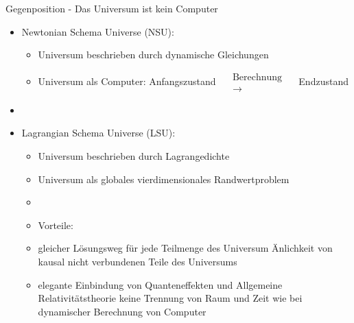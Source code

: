 \documentclass[aspectratio=1610, 9pt]{beamer}
\begin{document}
\begin{frame}{Gegenposition - Das Universum ist kein Computer}
  \begin{itemize}
    \item Newtonian Schema Universe (NSU):
    \begin{itemize}
      \item Universum beschrieben durch dynamische Gleichungen
      \item Universum als Computer: Anfangszustand $\quad \begin{matrix*}\text{Berechnung}\\ \longrightarrow\end{matrix*} \quad $ Endzustand
    \end{itemize}
    \item[]
    \item Lagrangian Schema Universe (LSU):
    \begin{itemize}
      \item Universum beschrieben durch Lagrangedichte
      \item Universum als globales vierdimensionales Randwertproblem
      \item[]
      \item Vorteile:
      \item gleicher Lösungsweg für jede Teilmenge des Universum \rightarrow Änlichkeit von kausal nicht verbundenen Teile des Universums
      \item elegante Einbindung von Quanteneffekten und Allgemeine Relativitätstheorie \rightarrow keine Trennung von Raum und Zeit wie bei dynamischer Berechnung von Computer
    \end{itemize}
  \end{itemize}

\end{frame}
\end{document}
